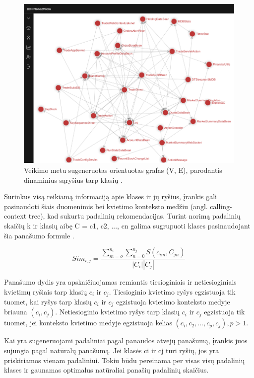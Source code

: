 \documentclass[fleqn]{VUMIFPSkursinis}
\begin{document}
\begin{figure}[H]
    \centering
    \includegraphics{img/mono-micro-grafas.png}
    \caption{Veikimo metu sugeneruotas orientuotas grafas (V, E), parodantis dinaminius sąryšius tarp klasių \cite{KXL+20}.}
    \label{img:mono-micro-grafas}
\end{figure}

Surinkus visą reikiamą informaciją apie klases ir jų ryšius, įrankis gali pasinaudoti šiais duomenimis bei kvietimo konteksto medžiu (angl. calling-context tree), kad sukurtu padalinių rekomendacijas. Turint norimą padalinių skaičių k ir klasių aibę C = {c1, c2, ..., cn} galima sugrupuoti klases pasinaudojant šia panašumo formule \cite{KXL+20}.

\begin{equation}\label{eq:panasumo-formule}
    Sim_{i,j} = \frac{\sum_{m=o}^{n_{i}}\sum_{n=0}^{n_{j}}S(c_{im},C_{jn})}{\left| C_{i} \right|\left| C_{j} \right|}
\end{equation}

Panašumo dydis yra apskaičiuojamas remiantis tiesioginiais ir netiesioginiais kvietimų ryšiais tarp klasių $c_{i}$ ir $c_{j}$. Tiesioginio kvietimo ryšys egzistuoja tik tuomet, kai ryšys tarp klasių $c_{i}$ ir $c_{j}$ egzistuoja kvietimo konteksto medyje briauna $(c_{i}, c_{j})$. Netiesioginio kvietimo ryšys tarp klasių $c_{i}$ ir $c_{j}$ egzistuoja tik tuomet, jei konteksto kvietimo medyje egzistuoja kelias $(c_{i}, c_{2}, ..., c_{p}, c_{j}), p > 1$.

Kai yra sugeneruojami padaliniai pagal panaudos atvejų panašumą, įrankis juos sujungia pagal natūralų panašumą. Jei klasės ci ir cj turi ryšių, jos yra priskiriamos vienam padaliniui. Tokiu būdu pereinama per visas visų padalinių klases ir gaunamas optimalus natūraliai panašių padalinių skaičius.
\end{document}
